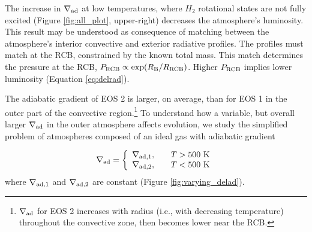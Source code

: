 
The increase in $\nabla_{\rm ad}$ at low temperatures, where $H_2$ rotational states are not fully excited (Figure \ref{fig:all_plot}, upper-right) decreases the atmosphere's luminosity.
This result may be understood as consequence of matching between the atmosphere's interior convective and exterior radiative profiles.  The profiles must match at the RCB, constrained by the known total mass.  This match determines the pressure at the RCB, $P_{\rm RCB} \propto \exp(R_{\rm B}/R_{\rm RCB})$. Higher $P_{\rm RCB}$ implies lower luminosity (Equation \ref{eq:delrad}).

The adiabatic gradient of EOS 2 is larger, on average, than for EOS 1 in the outer part of the convective region.\footnote {$\nabla_{\rm ad}$ for EOS 2 increases with radius (i.e., with decreasing temperature) throughout the convective zone, then becomes lower near the RCB.} To understand how a variable, but overall larger $\nabla_{\rm ad}$ in the outer atmosphere affects evolution, we study the simplified problem of atmospheres composed of an ideal gas with adiabatic gradient 

\begin{equation}
\label{eq:deladvar}
\nabla_{\rm ad} = \left\{
\begin{array}{l l}
\nabla_{\rm ad, 1}, & \quad T > 500 \text{ K} \\
\nabla_{\rm ad, 2}, & \quad T < 500 \text{ K}
\end{array} 
\right.
\end{equation}   
where $\nabla_{\rm ad, 1}$ and $\nabla_{\rm ad,2}$ are constant (Figure \ref{fig:varying_delad}).







